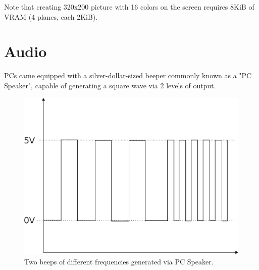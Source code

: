\documentclass[book.tex]{subfiles}
\begin{document}
\par
Note that creating 320x200 picture with 16 colors on the screen requires 8KiB of VRAM (4 planes, each 2KiB). 

















\section{Audio}
\label{hardware-audio}
PCs came equipped with a silver-dollar-sized beeper commonly known as a "PC Speaker", capable of generating a square wave via 2 levels of output.\\
\begin{figure}[H]

\centering

\end{figure}


\begin{figure}[H]

\centering
\includegraphics[width=.8\textwidth]{imgs/drawings/square_wave.eps}
\caption{Two beeps of different frequencies generated via PC Speaker.}
\end{figure}
\end{document}

